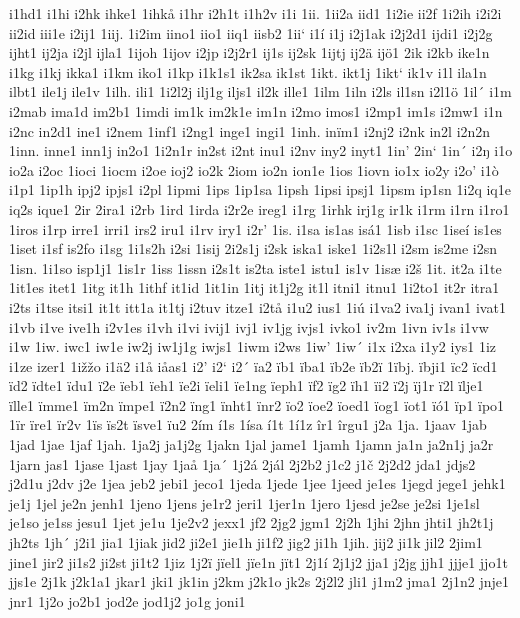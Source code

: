 i1hd1
i1hi
i2hk
ihke1
1ihkå
i1hr
i2h1t
i1h2v
i1i
1ii.
1ii2a
iid1
1i2ie
ii2f
1i2ih
i2i2i
ii2id
iii1e
i2ij1
1iij.
1i2im
iino1
iio1
iiq1
iisb2
1ii`
i1í
i1j
i2j1ak
i2j2d1
ijdi1
i2j2g
ijht1
ij2ja
i2jl
ijla1
1ijoh
1ijov
i2jp
i2j2r1
ij1s
ij2sk
1ijtj
ij2ä
ijö1
2ik
i2kb
ike1n
i1kg
i1kj
ikka1
i1km
iko1
i1kp
i1k1s1
ik2sa
ik1st
1ikt.
ikt1j
1ikt`
ik1v
i1l
ila1n
ilbt1
ile1j
ile1v
1ilh.
ili1
1i2l2j
ilj1g
iljs1
il2k
ille1
1ilm
1iln
i2ls
il1sn
i2l1ö
1il´
i1m
i2mab
ima1d
im2b1
1imdi
im1k
im2k1e
im1n
i2mo
imos1
i2mp1
im1s
i2mw1
i1n
i2nc
in2d1
ine1
i2nem
1inf1
i2ng1
inge1
ingi1
1inh.
inïm1
i2nj2
i2nk
in2l
i2n2n
1inn.
inne1
inn1j
in2o1
1i2n1r
in2st
i2nt
inu1
i2nv
iny2
inyt1
1in'
2in`
1in´
i2ŋ
i1o
io2a
i2oc
1ioci
1iocm
i2oe
ioj2
io2k
2iom
io2n
ion1e
1ios
1iovn
io1x
io2y
i2o'
i1ò
i1p1
1ip1h
ipj2
ipjs1
i2pl
1ipmi
1ips
1ip1sa
1ipsh
1ipsi
ipsj1
1ipsm
ip1sn
1i2q
iq1e
iq2s
ique1
2ir
2ira1
i2rb
1ird
1irda
i2r2e
ireg1
i1rg
1irhk
irj1g
ir1k
i1rm
i1rn
i1ro1
1iros
i1rp
irre1
irri1
irs2
iru1
i1rv
iry1
i2r'
1is.
i1sa
is1as
isá1
1isb
i1sc
1iseí
is1es
1iset
i1sf
is2fo
i1sg
1i1s2h
i2si
1isij
2i2s1j
i2sk
iska1
iske1
1i2s1l
i2sm
is2me
i2sn
1isn.
1i1so
isp1j1
1is1r
1iss
1issn
i2s1t
is2ta
iste1
istu1
is1v
1isæ
i2š
1it.
it2a
i1te
1it1es
itet1
1itg
it1h
1ithf
it1id
1it1in
1itj
it1j2g
it1l
itni1
itnu1
1i2to1
it2r
itra1
i2ts
i1tse
itsi1
it1t
itt1a
it1tj
i2tuv
itze1
i2tå
i1u2
ius1
1iú
i1va2
iva1j
ivan1
ivat1
i1vb
i1ve
ive1h
i2v1es
i1vh
i1vi
ivij1
ivj1
iv1jg
ivjs1
ivko1
iv2m
1ivn
iv1s
i1vw
i1w
1iw.
iwc1
iw1e
iw2j
iw1j1g
iwjs1
1iwm
i2ws
1iw'
1iw´
i1x
i2xa
i1y2
iys1
1iz
i1ze
izer1
1ižžo
i1ä2
i1å
iåas1
i2'
i2`
i2´
ïa2
ïb1
ïba1
ïb2e
ïb2ï
1ïbj.
ïbji1
ïc2
ïcd1
ïd2
ïdte1
ïdu1
ï2e
ïeb1
ïeh1
ïe2i
ïeli1
ïe1ng
ïeph1
ïf2
ïg2
ïh1
ïi2
ï2j
ïj1r
ï2l
ïlje1
ïlle1
ïmme1
ïm2n
ïmpe1
ï2n2
ïng1
ïnht1
ïnr2
ïo2
ïoe2
ïoed1
ïog1
ïot1
ïó1
ïp1
ïpo1
1ïr
ïre1
ïr2v
1ïs
ïs2t
ïsve1
ïu2
2ím
í1s
1ísa
í1t
1í1z
îr1
îrgu1
j2a
1ja.
1jaav
1jab
1jad
1jae
1jaf
1jah.
1ja2j
ja1j2g
1jakn
1jal
jame1
1jamh
1jamn
ja1n
ja2n1j
ja2r
1jarn
jas1
1jase
1jast
1jay
1jaå
1ja´
1j2á
2jál
2j2b2
j1c2
j1č
2j2d2
jda1
jdjs2
j2d1u
j2dv
j2e
1jea
jeb2
jebi1
jeco1
1jeda
1jede
1jee
1jeed
je1es
1jegd
jege1
jehk1
je1j
1jel
je2n
jenh1
1jeno
1jens
je1r2
jeri1
1jer1n
1jero
1jesd
je2se
je2si
1je1sl
je1so
je1ss
jesu1
1jet
je1u
1je2v2
jexx1
jf2
2jg2
jgm1
2j2h
1jhi
2jhn
jhti1
jh2t1j
jh2ts
1jh´
j2i1
jia1
1jiak
jid2
ji2e1
jie1h
ji1f2
jig2
ji1h
1jih.
jij2
ji1k
jil2
2jim1
jine1
jir2
ji1s2
ji2st
ji1t2
1jiz
1j2ï
jïel1
jïe1n
jït1
2j1í
2j1j2
jja1
j2jg
jjh1
jjje1
jjo1t
jjs1e
2j1k
j2k1a1
jkar1
jki1
jk1in
j2km
j2k1o
jk2s
2j2l2
jli1
j1m2
jma1
2j1n2
jnje1
jnr1
1j2o
jo2b1
jod2e
jod1j2
jo1g
joni1
